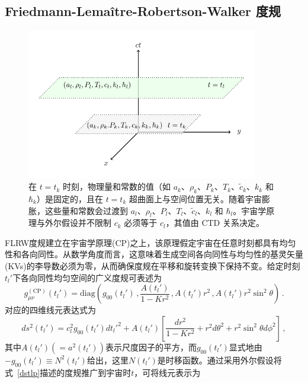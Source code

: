 \documentclass[jkps,preprint,fleqn]{revtex4}
\newcommand{\tc}{\tilde{c}}
\begin{document}
\begin{CJK*}{UTF8}{gbsn}
\section{Friedmann-Lemaître-Robertson-Walker 度规}
\label{sec:RWm}
\begin{figure}
	\begin{center}
	\includegraphics[width=0.9\textwidth]{Fig1.pdf}
	\caption{在 $t = t_k$ 时刻，物理量和常数的值（如 $a_k$、$\rho_k$、$P_k$、$T_k$、$\tc_k$、$k_{k}$ 和 $\hbar_k$）是固定的，且在 $t=t_k$ 超曲面上与空间位置无关。随着宇宙膨胀，这些量和常数会过渡到 $a_l$、$\rho_l$、$P_l$、$T_l$、$\tc_l$、$k_l$ 和 $\hbar_l$。宇宙学原理与外尔假设并不限制 $c_k$ 必须等于 $c_l$，其值由 CTD 关系决定。}
	\label{Fig1}
	\end{center}
\end{figure}
FLRW度规建立在宇宙学原理(CP)之上，该原理假定宇宙在任意时刻都具有均匀性和各向同性。从数学角度而言，这意味着生成空间各向同性与均匀性的基灵矢量(KVs)的李导数必须为零，从而确保度规在平移和旋转变换下保持不变\cite{Lee:2024mal,Ryder09}。给定时刻$t_l'$下各向同性均匀空间的广义度规可表述为
\begin{equation}
g_{\mu\nu}^{(\text{CP})}(t_l') = \text{diag} \left( g_{00}(t_l') \,,  \frac{A(t_l')}{1-Kr^2} \,,  A(t_l') r^2 \,,  A(t_l') r^2 \sin^2 \theta \right) \,.
\end{equation}
对应的四维线元表达式为
\begin{equation}
ds^2(t_l') = c_l^2 g_{00}(t_l') dt_l'^2 + A(t_l') \left[ \frac{dr^2}{1-Kr^2} + r^2 d \theta^2 + r^2 \sin^2 \theta d \phi^2 \right] \label{dstlp} \,,
\end{equation}
其中$A(t_l') (= a^2(t_l'))$表示尺度因子的平方，而$g_{00}(t_l')$显式地由$-g_{00}(t_l') \equiv N^2(t_l')$给出，这里$N(t_l')$是时移函数\cite{Lee:2024zcu,Ryder09}。通过采用外尔假设将式~\eqref{dstlp}描述的度规推广到宇宙时$t$，可将线元表示为

\end{CJK*}
\end{document}
